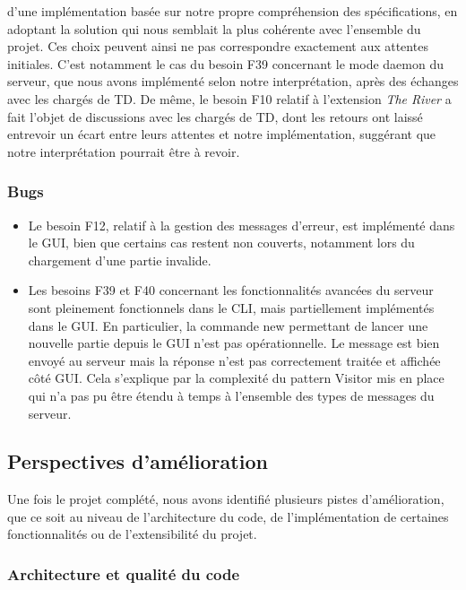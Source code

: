\documentclass[11pt]{article}
\begin{document}
\begin{itemize}
  d'une implémentation basée sur notre propre compréhension des 
  spécifications, en adoptant la solution qui nous semblait la plus 
  cohérente avec l'ensemble du projet. Ces choix peuvent ainsi ne pas 
  correspondre exactement aux attentes initiales.
  C'est notamment le cas du besoin F39 concernant le mode daemon du 
  serveur, que nous avons implémenté selon notre interprétation, après 
  des échanges avec les chargés de TD. De même, le besoin F10 relatif 
  à l'extension \textit{The River} a fait l'objet de discussions avec 
  les chargés de TD, dont les retours ont laissé entrevoir un écart 
  entre leurs attentes et notre implémentation, suggérant que notre 
  interprétation pourrait être à revoir.
\end{itemize}


\subsubsection{Bugs}

\begin{itemize}
  \item [-] Le besoin F12, relatif à la gestion des messages d’erreur, est implémenté dans le GUI, bien que certains cas restent non couverts, notamment lors du chargement d’une partie invalide.
  \item [-] Les besoins F39 et F40 concernant les fonctionnalités avancées du serveur sont pleinement fonctionnels dans le CLI, mais partiellement implémentés dans le GUI. 
  En particulier, la commande new permettant de lancer une nouvelle partie depuis le GUI n'est pas opérationnelle. Le message est bien envoyé au serveur mais la réponse n'est pas correctement traitée et affichée côté GUI. 
  Cela s'explique par la complexité du pattern Visitor mis en place qui n'a pas pu être étendu à temps à l'ensemble des types de messages du serveur.
\end{itemize}
\subsection{Perspectives d'amélioration}

Une fois le projet complété, nous avons identifié plusieurs pistes 
d'amélioration, que ce soit au niveau de l'architecture du code, de 
l'implémentation de certaines fonctionnalités ou de l'extensibilité 
du projet.

\subsubsection*{Architecture et qualité du code}
\end{document}
